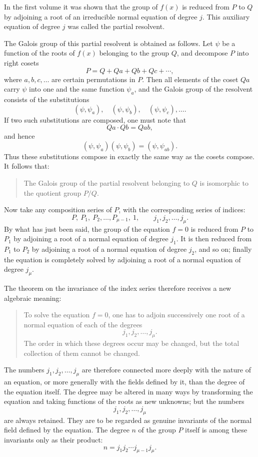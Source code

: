 \documentclass[11pt,a4paper]{book}
\begin{document}
In the first volume it was shown that the group of \(f(x)\) is reduced from \(P\) to \(Q\) by adjoining a root of an irreducible normal equation of degree \(j\).  This auxiliary equation of degree \(j\) was called the partial resolvent.

The Galois group of this partial resolvent is obtained as follows.  Let \(\psi\) be a function of the roots of \(f(x)\) belonging to the group \(Q\), and decompose \(P\) into right cosets
\[
 P=Q+Qa+Qb+Qc+\cdots ,
\]
where \(a,b,c,\ldots\) are certain permutations in \(P\).  Then all elements of the coset \(Qa\) carry \(\psi\) into one and the same function \(\psi_a\), and the Galois group of the resolvent consists of the substitutions
\[
 (\psi,\psi_a),\quad(\psi,\psi_b),\quad(\psi,\psi_c),\ldots .
\]
If two such substitutions are composed, one must note that
\[
 Qa\cdot Qb=Qab,
\]
and hence
\[
 (\psi,\psi_a)(\psi,\psi_b)=(\psi,\psi_{ab}).
\]
Thus these substitutions compose in exactly the same way as the cosets compose.  It follows that:

\begin{quote}
The Galois group of the partial resolvent belonging to \(Q\) is isomorphic to the quotient group \(P/Q\).
\end{quote}

Now take any composition series of \(P\), with the corresponding series of indices:
\[
 P,\ P_1,\ P_2,\ldots,P_{\mu-1},\ 1,
 \qquad
 j_1,j_2,\ldots,j_\mu .
\]
By what has just been said, the group of the equation \(f=0\) is reduced from \(P\) to \(P_1\) by adjoining a root of a normal equation of degree \(j_1\).  It is then reduced from \(P_1\) to \(P_2\) by adjoining a root of a normal equation of degree \(j_2\), and so on; finally the equation is completely solved by adjoining a root of a normal equation of degree \(j_\mu\).

The theorem on the invariance of the index series therefore receives a new algebraic meaning:

\begin{quote}
To solve the equation \(f=0\), one has to adjoin successively one root of a normal equation of each of the degrees
\[
 j_1,j_2,\ldots,j_\mu .
\]
The order in which these degrees occur may be changed, but the total collection of them cannot be changed.
\end{quote}

The numbers \(j_1,j_2,\ldots,j_\mu\) are therefore connected more deeply with the nature of an equation, or more generally with the fields defined by it, than the degree of the equation itself.  The degree may be altered in many ways by transforming the equation and taking functions of the roots as new unknowns; but the numbers
\[
 j_1,j_2,\ldots,j_\mu
\]
are always retained.  They are to be regarded as genuine invariants of the normal field defined by the equation.  The degree \(n\) of the group \(P\) itself is among these invariants only as their product:
\[
 n=j_1j_2\cdots j_{\mu-1}j_\mu .
\]
\end{document}
